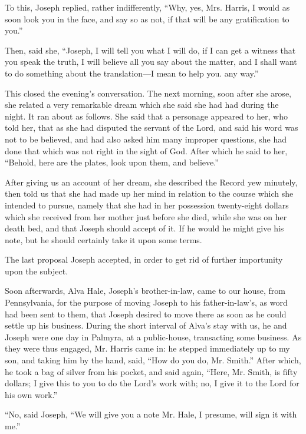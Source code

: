 		 To this, Joseph replied, rather indifferently, ``Why, yes, Mrs. Harris, I would as soon look you in the face, and say so as not, if that will be any gratification to you.''

		Then, said she, ``Joseph, I will tell you what I will do, if I can get a witness that you speak the truth, I will believe all you say about the matter, and I shall want to do something about the translation---I mean to help you. any way.''

		This closed the evening's conversation. The next morning, soon after she arose, she related a very remarkable dream which she said she had had during the night. It ran about as follows. She said that a personage appeared to her, who told her, that as she had disputed the servant of the Lord, and said his word was not to be believed, and had also asked him many improper questions, she had done that which was not right in the sight of God. After which he said to her, ``Behold, here are the plates, look upon them, and believe.''

		After giving us an account of her dream, she described the Record yew minutely, then told us that she had made up her mind in relation to the course which she intended to pursue, namely that she had in her possession twenty-eight dollars which she received from her mother just before she died, while she was on her death bed, and that Joseph should accept of it. If he would he might give his note, but he should certainly take it upon some terms.

		The last proposal Joseph accepted, in order to get rid of further importunity upon the subject.

		Soon afterwards, Alva Hale, Joseph's brother-in-law, came to our house, from Pennsylvania, for the purpose of moving Joseph to his father-in-law's, as word had been sent to them, that Joseph desired to move there as soon as he could settle up his business. During the short interval of Alva's stay with us, he and Joseph were one day in Palmyra, at a public-house, transacting some business. As they were thus engaged, Mr. Harris came in: he stepped immediately up to my son, and taking him by the hand, said, ``How do you do, Mr. Smith.'' After which, he took a bag of silver from his pocket, and said again, ``Here, Mr. Smith, is fifty dollars; I give this to you to do the Lord's work with; no, I give it to the Lord for his own work.''

		``No, said Joseph, ``We will give you a note Mr. Hale, I presume, will sign it with me.''

